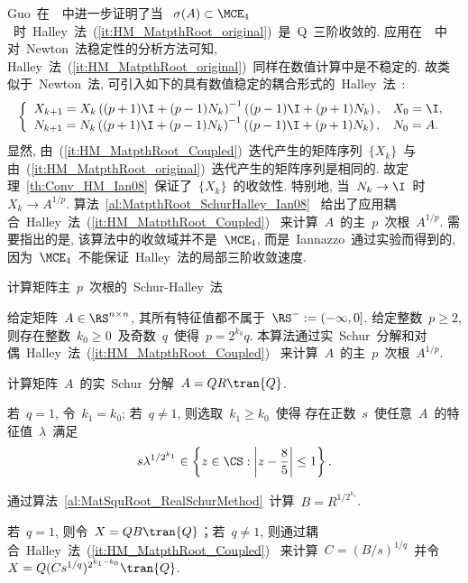Guo~在~\cite{Guo2010}~中进一步证明了当 ~$\sigma(A) \subset
\MCE_4$~时~Halley~法~(\ref{it:HM_MatpthRoot_original})~是~Q~三阶收敛的.
应用在~\cite{Iannazzo2006}~中对~Newton~法稳定性的分析方法可知,
Halley~法~(\ref{it:HM_MatpthRoot_original})~同样在数值计算中是不稳定的.
故类似于~Newton~法,
可引入如下的具有数值稳定的耦合形式的~Halley~法~\cite{Iannazzo2008}:
\begin{equation}
\label{it:HM_MatpthRoot_Coupled} \left\{
\begin{array}{ll}
\displaystyle X_{k+1} = X_k\left((p+1)\I + (p-1)N_k\right)^{-1}
\left((p-1)\I + (p+1)N_k\right),
& X_0 = \I, \\
\displaystyle N_{k + 1}  = N_k\left((p+1)\I + (p-1)N_k\right)^{-1}
\left((p-1)\I + (p+1)N_k\right), & \displaystyle N_0 = A.
\end{array} \right.
\end{equation}
显然,
由~(\ref{it:HM_MatpthRoot_Coupled})~迭代产生的矩阵序列~$\{X_k\}$~与
由~(\ref{it:HM_MatpthRoot_original})~迭代产生的矩阵序列是相同的.
故定理~\ref{th:Conv_HM_Ian08}~保证了~$\{X_k\}$~的收敛性. 特别地,
当~$N_k \to \I$~时~$X_k \to A^{1/p}$.
算法~\ref{al:MatpthRoot_SchurHalley_Ian08}~
给出了应用耦合~Halley~法~(\ref{it:HM_MatpthRoot_Coupled})~
来计算~$A$~的主~$p$~次根~$A^{1/p}$. 需要指出的是,
该算法中的收敛域并不是~$\MCE_4$, 而是~Iannazzo~通过实验而得到的,
因为~$\MCE_4$~不能保证~Halley~法的局部三阶收敛速度.

\begin{algorithm}[h!]
\caption{计算矩阵主~$p$~次根的~Schur-Halley~法~\cite[算法~
4]{Iannazzo2008}} \label{al:MatpthRoot_SchurHalley_Ian08}
给定矩阵~$A\in\RS^{n\times n}$, 其所有特征值都不属于~$\RS^- :=
(-\infty,0]$. 给定整数~$p\geq 2$, 则存在整数~$k_0 \geq
0$~及奇数~$q$~使得~$p = 2^{k_0}q$.
本算法通过实~Schur~分解和对偶~Halley~法~(\ref{it:HM_MatpthRoot_Coupled})~
来计算~$A$~的主~$p$~次根~$A^{1/p}$.
\begin{list}{.}{
\setlength{\rightmargin}{0em}\setlength{\leftmargin}{1.2em}}
\item
计算矩阵~$A$~的实~Schur~分解~$A = QR\tran{Q}$.
\item
若~$q=1$, 令~$k_1 = k_0$; 若~$q\neq1$, 则选取~$k_1\geq k_0$~使得
存在正数~$s$~使任意~$A$~的特征值~$\lambda$~满足
$$
s \lambda^{1/{2^{k_1}}} \in \left\{z\in \CS: \left|z -
\frac{8}{5}\right| \leq 1\right\}.
$$
\item
通过算法~\ref{al:MatSquRoot_RealSchurMethod}~计算~$B =
R^{1/{2^{k_1}}}$.
\item
若~$q=1$, 则令~$X = QB\tran{Q}$；若~$q\neq 1$,
则通过耦合~Halley~法~(\ref{it:HM_MatpthRoot_Coupled})~ 来计算~$C =
(B/s)^{1/q}$~并令~$X = Q(Cs^{1/q})^{2^{k_1-k_0}}\tran{Q}$.
\end{list}
\end{algorithm}




